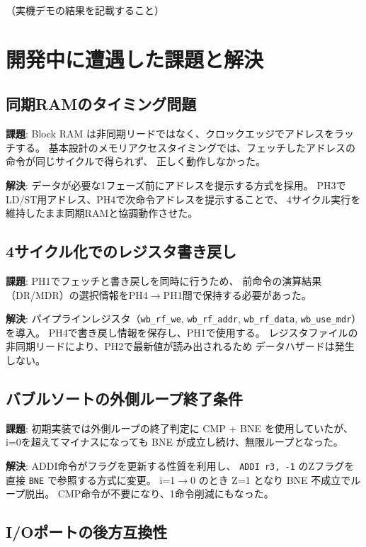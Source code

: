 \documentclass[a4paper,11pt]{ltjsarticle}
\begin{document}
（実機デモの結果を記載すること）


\section{開発中に遭遇した課題と解決}

\subsection{同期RAMのタイミング問題}

\textbf{課題}: Block RAM は非同期リードではなく、クロックエッジでアドレスをラッチする。
基本設計のメモリアクセスタイミングでは、フェッチしたアドレスの命令が同じサイクルで得られず、
正しく動作しなかった。

\textbf{解決}: データが必要な1フェーズ前にアドレスを提示する方式を採用。
PH3でLD/ST用アドレス、PH4で次命令アドレスを提示することで、
4サイクル実行を維持したまま同期RAMと協調動作させた。

\subsection{4サイクル化でのレジスタ書き戻し}

\textbf{課題}: PH1でフェッチと書き戻しを同時に行うため、
前命令の演算結果（DR/MDR）の選択情報をPH4$\to$PH1間で保持する必要があった。

\textbf{解決}: パイプラインレジスタ（\texttt{wb\_rf\_we}, \texttt{wb\_rf\_addr},
\texttt{wb\_rf\_data}, \texttt{wb\_use\_mdr}）を導入。
PH4で書き戻し情報を保存し、PH1で使用する。
レジスタファイルの非同期リードにより、PH2で最新値が読み出されるため
データハザードは発生しない。

\subsection{バブルソートの外側ループ終了条件}

\textbf{課題}: 初期実装では外側ループの終了判定に CMP + BNE を使用していたが、
i=0を超えてマイナスになっても BNE が成立し続け、無限ループとなった。

\textbf{解決}: ADDI命令がフラグを更新する性質を利用し、
\texttt{ADDI r3, -1} のZフラグを直接 \texttt{BNE} で参照する方式に変更。
i=1$\to$0 のとき Z=1 となり BNE 不成立でループ脱出。
CMP命令が不要になり、1命令削減にもなった。

\subsection{I/Oポートの後方互換性}
\end{document}
